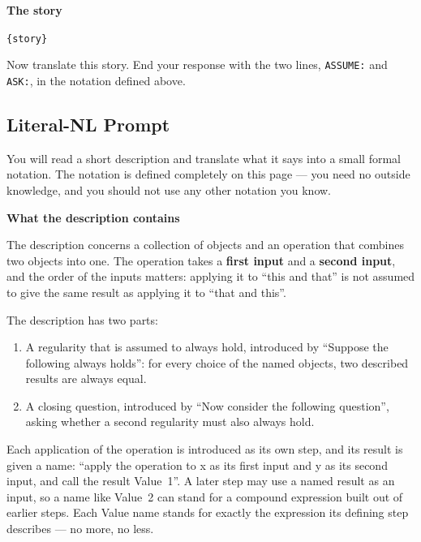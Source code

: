 \documentclass{article}
\begin{document}
\begin{promptbox}
\vspace{0.4em}
\noindent\textbf{The story}

\texttt{\{story\}}

\medskip
Now translate this story. End your response with the two lines,
\texttt{ASSUME:} and \texttt{ASK:}, in the notation defined above.

\end{promptbox}

\clearpage
\subsection{Literal-NL Prompt}
\begin{promptbox}
\footnotesize
\raggedright

You will read a short description and translate what it says into a small
formal notation. The notation is defined completely on this page --- you need
no outside knowledge, and you should not use any other notation you know.

\vspace{0.6em}
\noindent\textbf{What the description contains}

The description concerns a collection of objects and an operation that
combines two objects into one. The operation takes a \textbf{first input} and a
\textbf{second input}, and the order of the inputs matters: applying it to
``this and that'' is not assumed to give the same result as applying it to
``that and this''.

The description has two parts:
\begin{enumerate}
  \item A regularity that is assumed to always hold, introduced by
    ``Suppose the following always holds'': for every choice of the named
    objects, two described results are always equal.
  \item A closing question, introduced by ``Now consider the following
    question'', asking whether a second regularity must also always hold.
\end{enumerate}

Each application of the operation is introduced as its own step, and its
result is given a name: ``apply the operation to x as its first input and y
as its second input, and call the result Value~1''. A later step may use a
named result as an input, so a name like Value~2 can stand for a compound
expression built out of earlier steps. Each Value name stands for exactly
the expression its defining step describes --- no more, no less.


\end{promptbox}
\end{document}
